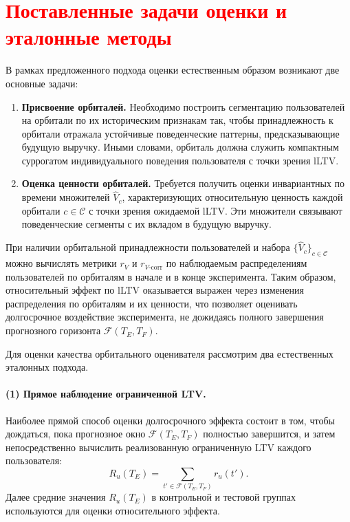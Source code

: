 \section{\textcolor{red}{Поставленные задачи оценки и эталонные методы}}

В рамках предложенного подхода оценки естественным образом
возникают две основные задачи:

\begin{enumerate}
    \item \textbf{Присвоение орбиталей.}
    Необходимо построить сегментацию пользователей на орбитали по их
    историческим признакам так, чтобы принадлежность к орбитали
    отражала устойчивые поведенческие паттерны, предсказывающие
    будущую выручку. Иными словами, орбиталь должна служить
    компактным суррогатом индивидуального поведения пользователя
    с точки зрения lLTV.

    \item \textbf{Оценка ценности орбиталей.}
    Требуется получить оценки инвариантных по времени множителей $\hat{V}_c$, 
    характеризующих относительную ценность каждой орбитали $c \in \mathcal{C}$ с точки
    зрения ожидаемой lLTV. Эти множители связывают
    поведенческие сегменты с их вкладом в будущую выручку.
\end{enumerate}

При наличии орбитальной принадлежности пользователей и набора
$\{\hat{V}_c\}_{c \in \mathcal{C}}$ можно вычислять метрики $r_V$ и
$r_{V\text{-corr}}$ по наблюдаемым распределениям пользователей по
орбиталям в начале и в конце эксперимента. Таким образом, относительный
эффект по lLTV оказывается выражен через изменения
распределения по орбиталям и их ценности, что позволяет оценивать
долгосрочное воздействие эксперимента, не дожидаясь полного завершения
прогнозного горизонта $\mathcal{F}(T_E, T_F)$.

Для оценки качества орбитального оценивателя рассмотрим два
естественных эталонных подхода.


\paragraph{(1) Прямое наблюдение ограниченной LTV.}

Наиболее прямой способ оценки долгосрочного эффекта состоит в том,
чтобы дождаться, пока прогнозное окно $\mathcal{F}(T_E, T_F)$ полностью
завершится, и затем непосредственно вычислить реализованную ограниченную
LTV каждого пользователя:
\[
  R_u(T_E) = \sum_{t' \in \mathcal{F}(T_E, T_F)} r_u(t').
\]
Далее средние значения $R_u(T_E)$ в контрольной и тестовой группах
используются для оценки относительного эффекта.


